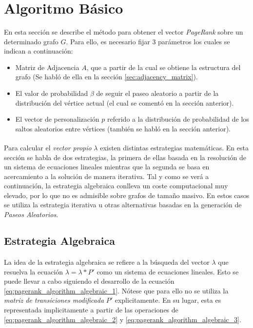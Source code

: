 \documentclass{subfiles}
\begin{document}
    \section{Algoritmo Básico}
    \label{sec:pagerank_algorithm}

      \paragraph{}
      En esta sección se describe el método para obtener el vector \emph{PageRank} sobre un determinado grafo $G$. Para ello, es necesario fijar 3 parámetros los cuales se indican a continuación:
      \begin{itemize}
        \item Matriz de Adjacencia $A$, que a partir de la cual se obtiene la estructura del grafo (Se habló de ella en la sección \ref{sec:adjacency_matrix}).
        \item El valor de probabilidad $\beta$ de seguir el paseo aleatorio a partir de la distribución del vértice actual (el cual se comentó en la sección anterior).
        \item El vector de personalización $p$ referido a la distribución de probabilidad de los saltos aleatorios entre vértices (también se habló en la sección anterior).
      \end{itemize}

      \paragraph{}
      Para calcular el \emph{vector propio} $\lambda$ existen distintas estrategias matemáticas. En esta sección se habla de dos estrategias, la primera de ellas basada en la resolución de un sistema de ecuaciones lineales mientras que la segunda se basa en acercamiento a la solución de manera iterativa. Tal y como se verá a continuación, la estrategia algebraica conlleva un coste computacional muy elevado, por lo que no es admisible sobre grafos de tamaño masivo. En estos casos se utiliza la estrategia iterativa u otras alternativas basadas en la generación de \emph{Paseos Aleatorios}.


      \subsection{Estrategia Algebraica}
      \label{sec:pagerank_algorithm_algebraic}

        \paragraph{}
        La idea de la estrategia algebraica se refiere a la búsqueda del vector $\lambda$ que resuelva la ecuación $\lambda = \lambda * P'$ como un sistema de ecuaciones lineales. Esto se puede llevar a cabo siguiendo el desarrollo de la ecuación \eqref{eq:pagerank_algorithm_algebraic_1}. Nótese que para ello no se utiliza la \emph{matriz de transiciones modificada} $P'$ explicitamente. En su lugar, esta es representada implicitamente a partir de las operaciones de \eqref{eq:pagerank_algorithm_algebraic_2} y \eqref{eq:pagerank_algorithm_algebraic_3}.
\end{document}
